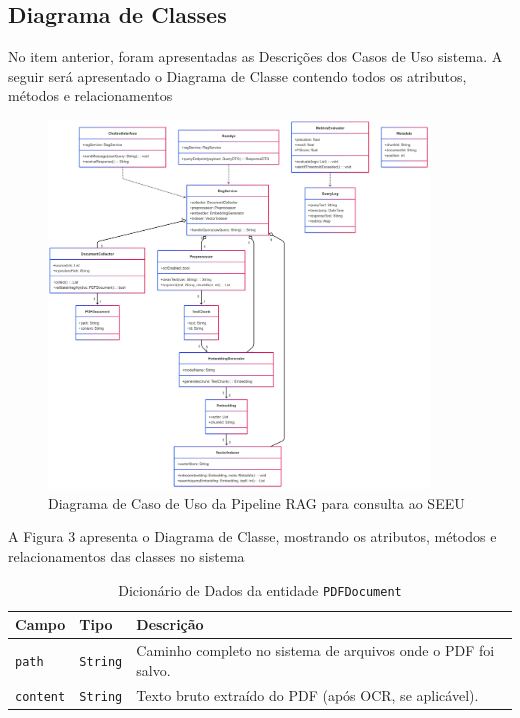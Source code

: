 \begin{description}
\section{Diagrama de Classes}
\label{sec:diagrama-de-classes}
\noindent No item anterior, foram apresentadas as Descrições dos Casos de Uso 
sistema. A seguir será apresentado o Diagrama de Classe contendo todos os 
atributos, métodos e relacionamentos

\begin{figure}[H]
  \centering
  \includegraphics[width=0.9\textwidth]{04-figuras/diagrama_de_classe.png}
  \caption{Diagrama de Caso de Uso da Pipeline RAG para consulta ao SEEU}
  \label{fig:diagrama-rag-seeu}
\end{figure}

\noindent A Figura 3 apresenta o Diagrama de Classe, mostrando os atributos, 
métodos e relacionamentos das classes no sistema 

\begin{table}[H]
  \centering
  \caption{Dicionário de Dados da entidade \texttt{PDFDocument}}
  \label{tab:dd_pdfdocument}
  \begin{tabular}{|p{3cm}|p{4cm}|p{8cm}|}
    \hline
    \textbf{Campo} & \textbf{Tipo} & \textbf{Descrição} \\ \hline
    \texttt{path}     & \texttt{String} & Caminho completo no sistema de arquivos onde o PDF foi salvo. \\ \hline
    \texttt{content}  & \texttt{String} & Texto bruto extraído do PDF (após OCR, se aplicável). \\ \hline
  \end{tabular}
\end{table}


\end{description}
